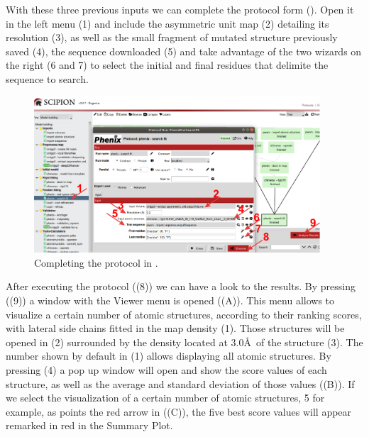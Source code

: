   With these three previous inputs we can complete the  protocol form (). Open it in the \scipion left menu (1) and include the asymmetric unit map (2) detailing its resolution (3), as well as the small fragment of mutated structure previously saved (4), the sequence downloaded (5) and take advantage of the two wizards on the right (6 and 7) to select the initial and final residues that delimite the sequence to search. 
  
  
   \begin{figure}[H]
  \centering 
  \captionsetup{width=.9\linewidth} 
  \includegraphics[width=0.95\textwidth]{Images/Fig_search_fit_3.pdf}
  \caption{Completing the  protocol in \scipion.}
  \label{fig:phenix_search_fit_3}
  \end{figure}
  
  After executing the  protocol ((8)) we can have a look to the results. By pressing  ((9)) a window with the Viewer menu is opened ((A)). This menu allows to visualize a certain number of  atomic structures, according to their ranking scores, with lateral side chains fitted in the map density (1). Those structures will be opened in \chimera (2) surrounded by the density located at 3.0\AA\ of the structure (3). The number  shown by default in (1) allows displaying all atomic structures. By pressing  (4) a pop up window will open and show the score values of each structure, as well as the average and standard deviation of those values ((B)). If we select the visualization of a certain number of atomic structures, 5 for example, as points the red arrow in ((C)), the five best score values will appear remarked in red in the Summary Plot. 

